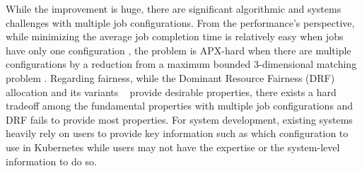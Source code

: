 While the improvement is huge, there are significant algorithmic and systems challenges with multiple job configurations. From the performance's perspective, while minimizing the average job completion time is relatively easy when jobs have only one configuration \cite{labetoulle1984preemptive}, the problem is APX-hard when there are multiple configurations by a reduction from a maximum bounded 3-dimensional matching problem \cite{hoogeveen1998non}. %
%
%
%
%
Regarding fairness, while the Dominant Resource Fairness (DRF) allocation and its variants
~\cite{drf,hug,parkes2015beyond, drfq,choosy,drf_hetor} provide desirable properties, there exists a hard tradeoff among the fundamental properties with multiple job configurations and DRF fails to provide most properties. %
For system development, existing systems heavily rely on users to provide key information such as which configuration to use in Kubernetes while users may not have the expertise or the system-level information to do so.

